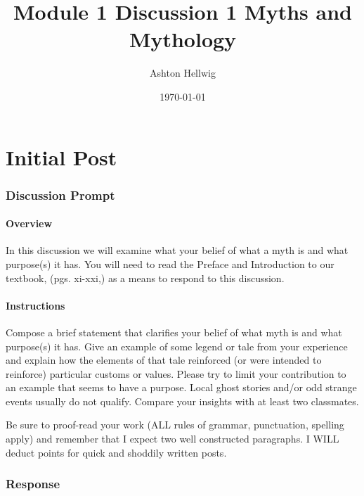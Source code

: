 \documentclass[12pt]{article}
\title{%
    Module 1 Discussion 1%
    \large{Myths and Mythology}
  }
\author{Ashton Hellwig}
\date{\today}
\theoremstyle{definition}
\theoremstyle{plain}
\begin{document}
  \maketitle
  \tableofcontents
  \lstlistoflistings
  \newpage


  \part{Initial Post}

    \section{Discussion Prompt}
      \begin{mdframed}
        \subsection{Overview}
          In this discussion we will examine what your belief of what a myth is
            and what purpose(s) it has.  You will need to read the Preface and
            Introduction to our textbook, (pgs. xi-xxi,) as a means to respond
            to this discussion.

        \subsection{Instructions}
          Compose a brief statement that clarifies your belief of what myth is
            and what purpose(s) it has. Give an example of some legend or tale
            from your experience and explain how the elements of that tale
            reinforced (or were intended to reinforce) particular customs or
            values. Please try to limit your contribution to an example that
            seems to have a purpose. Local ghost stories and/or odd strange
            events usually do not qualify. Compare your insights with at least
            two classmates.

          Be sure to proof-read your work (ALL rules of grammar, punctuation,
            spelling apply) and remember that I expect two well constructed
            paragraphs. I WILL deduct points for quick and shoddily written
            posts.
      \end{mdframed}

    \section{Response}
\end{document}
